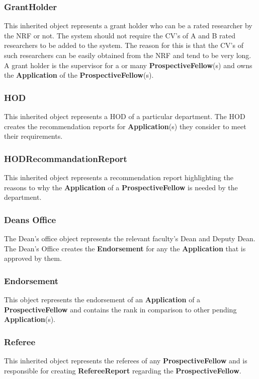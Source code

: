\documentclass[12pt]{article}
\begin{document}
\subsubsection{GrantHolder}
This inherited object represents a grant holder who can be a rated researcher by the NRF or not. The system should not require the CV's of A and B rated researchers to be added to the system. The reason for this is that the CV's of such researchers can be easily obtained from the NRF and tend to be very long. A grant holder is the supervisor for a or many \textbf{ProspectiveFellow}(s) and owns the \textbf{Application} of the \textbf{ProspectiveFellow}(s).

\subsubsection{HOD}
This inherited object represents a HOD of a particular department. The HOD creates the recommendation reports for \textbf{Application}(s) they consider to meet their requirements.\\

\subsubsection{HODRecommandationReport}
This inherited object represents a recommendation report highlighting the reasons to why the \textbf{Application} of a \textbf{ProspectiveFellow} is needed by the department.

\subsubsection{Deans Office}
The Dean's office object represents the relevant faculty's Dean and Deputy Dean. The Dean's Office creates the \textbf{Endorsement} for any the \textbf{Application} that is approved by them.

\subsubsection{Endorsement}
This object represents the endorsement of an \textbf{Application} of a \textbf{ProspectiveFellow} and contains the rank in comparison to other pending \textbf{Application}(s).

\subsubsection{Referee}
This inherited object represents the referees of any \textbf{ProspectiveFellow} and is responsible for creating \textbf{RefereeReport} regarding the \textbf{ProspectiveFellow}.
\end{document}
